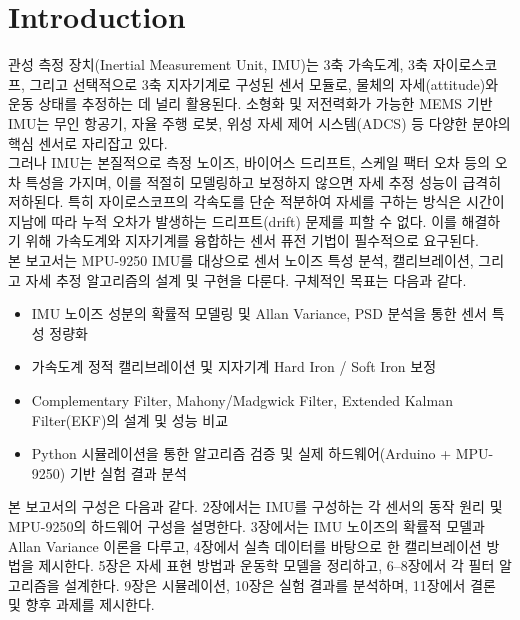 \section{Introduction}
    관성 측정 장치(Inertial Measurement Unit, IMU)는 3축 가속도계, 3축 자이로스코프, 그리고 선택적으로 3축 지자기계로 구성된 센서 모듈로, 물체의 자세(attitude)와 운동 상태를 추정하는 데 널리 활용된다. 소형화 및 저전력화가 가능한 MEMS 기반 IMU는 무인 항공기, 자율 주행 로봇, 위성 자세 제어 시스템(ADCS) 등 다양한 분야의 핵심 센서로 자리잡고 있다.\\

    그러나 IMU는 본질적으로 측정 노이즈, 바이어스 드리프트, 스케일 팩터 오차 등의 오차 특성을 가지며, 이를 적절히 모델링하고 보정하지 않으면 자세 추정 성능이 급격히 저하된다. 특히 자이로스코프의 각속도를 단순 적분하여 자세를 구하는 방식은 시간이 지남에 따라 누적 오차가 발생하는 드리프트(drift) 문제를 피할 수 없다. 이를 해결하기 위해 가속도계와 지자기계를 융합하는 센서 퓨전 기법이 필수적으로 요구된다.\\

    본 보고서는 MPU-9250 IMU를 대상으로 센서 노이즈 특성 분석, 캘리브레이션, 그리고 자세 추정 알고리즘의 설계 및 구현을 다룬다. 구체적인 목표는 다음과 같다.\\

    \begin{itemize}
        \item IMU 노이즈 성분의 확률적 모델링 및 Allan Variance, PSD 분석을 통한 센서 특성 정량화\cite{smith2023}
        \item 가속도계 정적 캘리브레이션 및 지자기계 Hard Iron / Soft Iron 보정
        \item Complementary Filter, Mahony/Madgwick Filter, Extended Kalman Filter(EKF)의 설계 및 성능 비교
        \item Python 시뮬레이션을 통한 알고리즘 검증 및 실제 하드웨어(Arduino + MPU-9250) 기반 실험 결과 분석
    \end{itemize}

    본 보고서의 구성은 다음과 같다. 2장에서는 IMU를 구성하는 각 센서의 동작 원리 및 MPU-9250의 하드웨어 구성을 설명한다. 3장에서는 IMU 노이즈의 확률적 모델과 Allan Variance 이론을 다루고, 4장에서 실측 데이터를 바탕으로 한 캘리브레이션 방법을 제시한다. 5장은 자세 표현 방법과 운동학 모델을 정리하고, 6--8장에서 각 필터 알고리즘을 설계한다. 9장은 시뮬레이션, 10장은 실험 결과를 분석하며, 11장에서 결론 및 향후 과제를 제시한다.\\